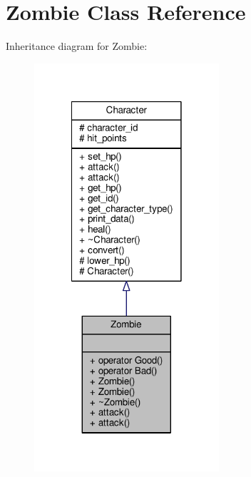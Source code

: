 \hypertarget{class_zombie}{\section{Zombie Class Reference}
\label{class_zombie}
}


Inheritance diagram for Zombie\-:
\nopagebreak
\begin{figure}[H]
\begin{center}
\leavevmode
\includegraphics[width=194pt]{class_zombie__inherit__graph}
\end{center}
\end{figure}


